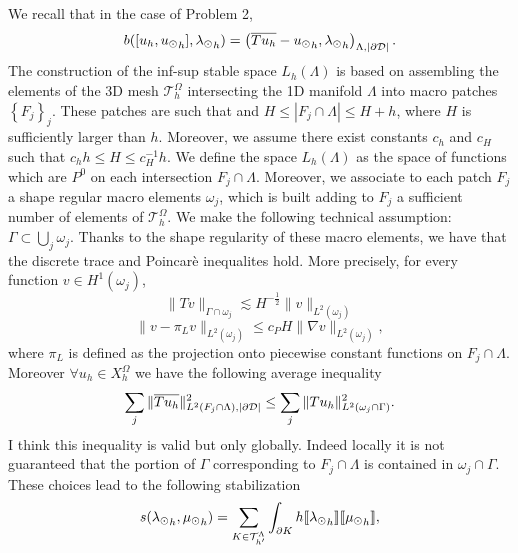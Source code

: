 We recall that in the case of Problem 2, 
\begin{equation*}
b([u_h, {u_{\odot}}_h], {\lambda_{\odot}}_h) = \left(\overline{T u_h} - {u_{\odot}}_h, {\lambda_{\odot}}_h\right)_{\Lambda,|\partial\mathcal{D}|}.
\end{equation*}
The construction of the inf-sup stable space $L_h(\Lambda)$ is based on assembling the elements of the 3D mesh $\mathcal{T}_h^{\Omega}$ intersecting the 1D manifold $\Lambda$ into macro patches $\left\{ F_j \right\}_j$. These patches are such that and  $H\leq |F_j\cap \Lambda|\leq H+h$, where $H$ is sufficiently larger than $h$. Moreover,  we assume there exist constants $c_h$ and $c_H$ such that $c_h h\leq H \leq c_H^{-1}h$. We define the space $L_h(\Lambda)$ as the space of functions which are $P^0$ on each intersection $F_j\cap \Lambda$. Moreover, we associate to each patch $F_j$ a shape regular macro elements $\omega_j$, which is built adding to $F_j$ a sufficient number of elements of $\mathcal{T}_h^{\Omega}$. We make the following technical assumption: $\Gamma \subset \bigcup _{j} \omega_j$. Thanks to the shape regularity of these macro elements,  we have that the discrete trace and Poincarè inequalites hold. More precisely, for every function $v\in H^1(\omega_j)$,
\begin{equation}\label{discr_trace_ineq}
\|Tv\|_{\Gamma\cap \omega_j} \lesssim H^{-\frac 12} \|v\|_{L^2(\omega_j)}
\end{equation}
\begin{equation}\label{disc_poincare_ineq}
\|v- \pi_Lv\|_{L^2(\omega_j)} \leq c_P H \|\nabla v\|_{L^2(\omega_j)},
\end{equation}
where $\pi_L$ is defined as the projection onto piecewise constant functions on $F_j\cap \Lambda$.
 Moreover $\forall u_h \in X_h^\Omega$ we have the following average inequality 
\begin{equation*}
\sum _j \|\overline{T u_h}\|^2_{L^2(F_j \cap \Lambda),|\partial\mathcal{D}| } \leq \sum _j \|T u_h\|^2_{L^2(\omega_j\cap \Gamma)}.
\end{equation*}
{\color{red} I think this inequality is valid but only globally. Indeed locally it is not guaranteed that the portion of $\Gamma$ corresponding to $F_j \cap \Lambda$ is contained in $\omega _j \cap \Gamma$}. \\
These choices lead to the following stabilization 
\begin{equation*}
s({\lambda_{\odot}}_h, {\mu_{\odot}}_h)= \sum _{K\in \mathcal{T}_{h'}^{\Lambda}} \int_{\partial K} h \llbracket {\lambda_{\odot}}_h \rrbracket \llbracket {\mu_{\odot}}_h \rrbracket,
\end{equation*}
